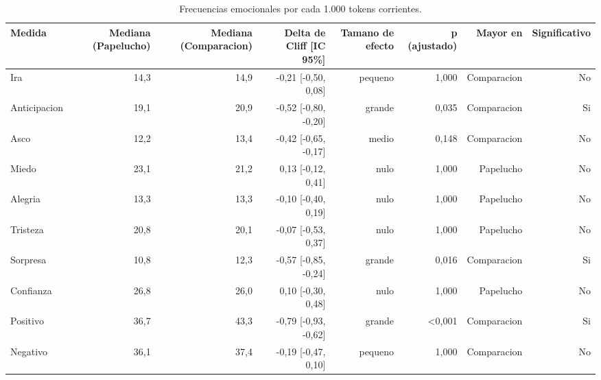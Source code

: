 \begin{table}[htbp]
\centering
\small
\caption{Frecuencias emocionales por cada 1.000 tokens corrientes.}
\label{tab:emotions-normalised-es}
\begin{tabular}{lrrrrrrr}
\toprule
\textbf{Medida} & \textbf{Mediana (Papelucho)} & \textbf{Mediana (Comparacion)} & \textbf{Delta de Cliff [IC 95\%]} & \textbf{Tamano de efecto} & \textbf{p (ajustado)} & \textbf{Mayor en} & \textbf{Significativo} \\
\midrule
Ira & 14,3 & 14,9 & -0,21 [-0,50, 0,08] & pequeno & 1,000 & Comparacion & No \\
Anticipacion & 19,1 & 20,9 & -0,52 [-0,80, -0,20] & grande & 0,035 & Comparacion & Si \\
Asco & 12,2 & 13,4 & -0,42 [-0,65, -0,17] & medio & 0,148 & Comparacion & No \\
Miedo & 23,1 & 21,2 & 0,13 [-0,12, 0,41] & nulo & 1,000 & Papelucho & No \\
Alegria & 13,3 & 13,3 & -0,10 [-0,40, 0,19] & nulo & 1,000 & Papelucho & No \\
Tristeza & 20,8 & 20,1 & -0,07 [-0,53, 0,37] & nulo & 1,000 & Papelucho & No \\
Sorpresa & 10,8 & 12,3 & -0,57 [-0,85, -0,24] & grande & 0,016 & Comparacion & Si \\
Confianza & 26,8 & 26,0 & 0,10 [-0,30, 0,48] & nulo & 1,000 & Papelucho & No \\
Positivo & 36,7 & 43,3 & -0,79 [-0,93, -0,62] & grande & <0,001 & Comparacion & Si \\
Negativo & 36,1 & 37,4 & -0,19 [-0,47, 0,10] & pequeno & 1,000 & Comparacion & No \\
\bottomrule
\end{tabular}
\end{table}

